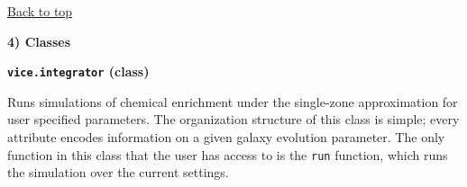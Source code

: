 \documentclass{report}
\begin{document}
\vfill
\hyperlink{top}{Back to top}
\clearpage 



\newpage
\null\par\noindent
\hypertarget{sec:classes}{\textbf{4) Classes}} \par\noindent

\null\par\noindent
\hypertarget{obj:integrator}{\textbf{\texttt{vice.integrator} (class)}} 
\par 
Runs simulations of chemical enrichment under the single-zone approximation for 
user specified parameters. The organization structure of this class is simple; 
every attribute encodes information on a given galaxy evolution parameter. The 
only function in this class that the user has access to is the \texttt{run} 
function, which runs the simulation over the current settings. 
\end{document}
